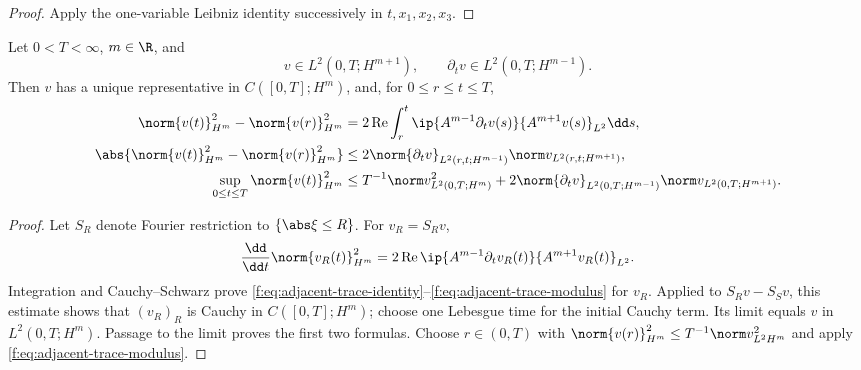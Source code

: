 \begin{proof}
Apply the one-variable Leibniz identity successively in \(t,x_1,x_2,x_3\).
\end{proof}

\begin{lemma}
\label{f:lem:adjacent-trace}
Let \(0<T<\infty\), \(m\in\R\), and
\[
 v\in L^2(0,T;H^{m+1}),
 \qquad
 \partial_tv\in L^2(0,T;H^{m-1}).
\]
Then \(v\) has a unique representative in \(C([0,T];H^m)\), and, for
\(0\le r\le t\le T\),
\begin{align}
 \norm{v(t)}_{H^m}^2-\norm{v(r)}_{H^m}^2
 &=2\operatorname{Re}\int_r^t
 \ip{A^{m-1}\partial_tv(s)}{A^{m+1}v(s)}_{L^2}\dd s,
 \label{f:eq:adjacent-trace-identity}\\
 \abs{\norm{v(t)}_{H^m}^2-\norm{v(r)}_{H^m}^2}
 &\le2\norm{\partial_tv}_{L^2(r,t;H^{m-1})}
 \norm v_{L^2(r,t;H^{m+1})},
 \label{f:eq:adjacent-trace-modulus}\\
 \sup_{0\le t\le T}\norm{v(t)}_{H^m}^2
 &\le T^{-1}\norm v_{L^2(0,T;H^m)}^2
 +2\norm{\partial_tv}_{L^2(0,T;H^{m-1})}
 \norm v_{L^2(0,T;H^{m+1})}.
 \label{f:eq:adjacent-trace-sup}
\end{align}
\end{lemma}

\begin{proof}
Let \(S_R\) denote Fourier restriction to \(\{\abs\xi\le R\}\).  For
\(v_R=S_Rv\),
\[
 \frac{\dd}{\dd t}\norm{v_R(t)}_{H^m}^2
 =2\operatorname{Re}\ip{A^{m-1}\partial_tv_R(t)}
 {A^{m+1}v_R(t)}_{L^2}.
\]
Integration and Cauchy--Schwarz prove
\eqref{f:eq:adjacent-trace-identity}--\eqref{f:eq:adjacent-trace-modulus} for
\(v_R\).  Applied to \(S_Rv-S_Sv\), this estimate shows that
\((v_R)_R\) is Cauchy in \(C([0,T];H^m)\); choose one Lebesgue time for the
initial Cauchy term.  Its limit equals \(v\) in
\(L^2(0,T;H^m)\).  Passage to the limit proves the first two formulas.
Choose \(r\in(0,T)\) with
\(\norm{v(r)}_{H^m}^2\le T^{-1}\norm v_{L^2H^m}^2\) and apply
\eqref{f:eq:adjacent-trace-modulus}.
\end{proof}

